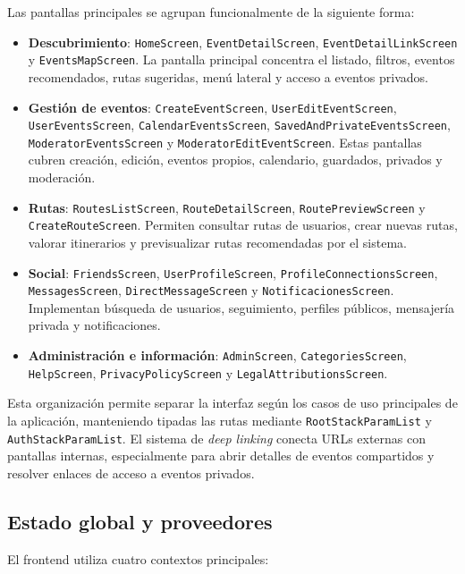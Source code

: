 Las pantallas principales se agrupan funcionalmente de la siguiente forma:

\begin{itemize}
    \item \textbf{Descubrimiento}: \texttt{HomeScreen}, \texttt{EventDetailScreen}, \texttt{EventDetailLinkScreen} y \texttt{EventsMapScreen}. La pantalla principal concentra el listado, filtros, eventos recomendados, rutas sugeridas, menú lateral y acceso a eventos privados.
    \item \textbf{Gestión de eventos}: \texttt{CreateEventScreen}, \texttt{UserEditEventScreen}, \texttt{UserEventsScreen}, \texttt{CalendarEventsScreen}, \texttt{SavedAndPrivateEventsScreen}, \texttt{ModeratorEventsScreen} y \texttt{ModeratorEditEventScreen}. Estas pantallas cubren creación, edición, eventos propios, calendario, guardados, privados y moderación.
    \item \textbf{Rutas}: \texttt{RoutesListScreen}, \texttt{RouteDetailScreen}, \texttt{RoutePreviewScreen} y \texttt{CreateRouteScreen}. Permiten consultar rutas de usuarios, crear nuevas rutas, valorar itinerarios y previsualizar rutas recomendadas por el sistema.
    \item \textbf{Social}: \texttt{FriendsScreen}, \texttt{UserProfileScreen}, \texttt{ProfileConnectionsScreen}, \texttt{MessagesScreen}, \texttt{DirectMessageScreen} y \texttt{NotificacionesScreen}. Implementan búsqueda de usuarios, seguimiento, perfiles públicos, mensajería privada y notificaciones.
    \item \textbf{Administración e información}: \texttt{AdminScreen}, \texttt{CategoriesScreen}, \texttt{HelpScreen}, \texttt{PrivacyPolicyScreen} y \texttt{LegalAttributionsScreen}.
\end{itemize}

Esta organización permite separar la interfaz según los casos de uso principales de la aplicación, manteniendo tipadas las rutas mediante \texttt{RootStackParamList} y \texttt{AuthStackParamList}. El sistema de \textit{deep linking} conecta URLs externas con pantallas internas, especialmente para abrir detalles de eventos compartidos y resolver enlaces de acceso a eventos privados.

\subsection{Estado global y proveedores}

El frontend utiliza cuatro contextos principales:

